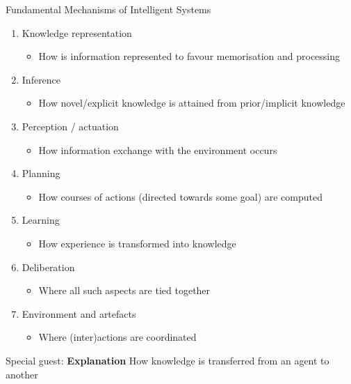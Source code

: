 \documentclass[presentation]{beamer}\mode<presentation>{\usetheme{AMSBolognaFC}}
\begin{document}
\begin{frame}[c,allowframebreaks]{Fundamental Mechanisms of Intelligent Systems}
%
\begin{enumerate}
    \item Knowledge representation
    \begin{itemize}
        \item How is information represented to favour memorisation and processing
    \end{itemize}
    \item Inference
    \begin{itemize}
        \item How novel/explicit knowledge is attained from prior/implicit knowledge
    \end{itemize}
    \item Perception / actuation
    \begin{itemize}
        \item How information exchange with the environment occurs
    \end{itemize}
    \item Planning
    \begin{itemize}
        \item How courses of actions (directed towards some goal) are computed
    \end{itemize}
    \item Learning
    \begin{itemize}
        \item How experience is transformed into knowledge
    \end{itemize}
    \item Deliberation
    \begin{itemize}
        \item Where all such aspects are tied together
    \end{itemize}
    \item Environment and artefacts
    \begin{itemize}
        \item Where (inter)actions are coordinated
    \end{itemize}
\end{enumerate}
%
\framebreak
%
\begin{block}{Special guest: \textbf{Explanation}}
    How knowledge is \alert{transferred} from an agent to another
    \begin{itemize}

\end{itemize}
\end{block}
\end{frame}
\end{document}
